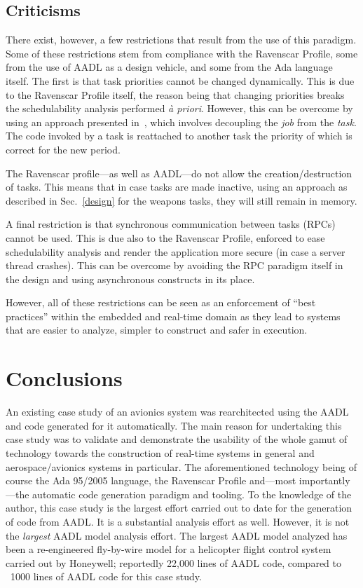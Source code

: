 \subsection{Criticisms}
There exist, however, a few restrictions that result from the use of
this paradigm. Some of these restrictions stem from compliance with
the Ravenscar Profile, some from the use of AADL as a design vehicle,
and some from the Ada language itself. The first is that task
priorities cannot be changed dynamically. This is due to the Ravenscar
Profile itself, the reason being that changing priorities breaks the
schedulability analysis performed \emph{\`a priori}. However, this can
be overcome by using an approach presented in~\cite{puente@adalett01},
which involves decoupling the \emph{job} from the \emph{task}. The
code invoked by a task is reattached to another task the priority of
which is correct for the new period.

The Ravenscar profile---as well as AADL---do not allow the
creation/destruction of tasks. This means that in case tasks are made
inactive, using an approach as described in Sec.~\ref{design} for the
weapons tasks, they will still remain in memory.

A final restriction is that synchronous communication between tasks
(RPCs) cannot be used. This is due also to the Ravenscar Profile,
enforced to ease schedulability analysis and render the application
more secure (in case a server thread crashes). This can be overcome by
avoiding the RPC paradigm itself in the design and using asynchronous
constructs in its place.

However, all of these restrictions can be seen as an enforcement of
``best practices'' within the embedded and real-time domain as they
lead to systems that are easier to analyze, simpler to construct and
safer in execution.

\section{Conclusions}
\label{conclusions}
An existing case study of an avionics system was rearchitected using
the AADL and code generated for it automatically. The main reason for
undertaking this case study was to validate and demonstrate the
usability of the whole gamut of technology towards the construction of
real-time systems in general and aerospace/avionics systems in
particular. The aforementioned technology being of course the Ada
95/2005 language, the Ravenscar Profile and---most importantly---the
automatic code generation paradigm and tooling. To the knowledge of
the author, this case study is the largest effort carried out to date
for the generation of code from AADL. It is a substantial analysis
effort as well. However, it is not the \emph{largest} AADL model
analysis effort. The largest AADL model analyzed has been a
re-engineered fly-by-wire model for a helicopter flight control system
carried out by Honeywell; reportedly 22,000 lines of AADL code,
compared to ~1000 lines of AADL code for this case study.

